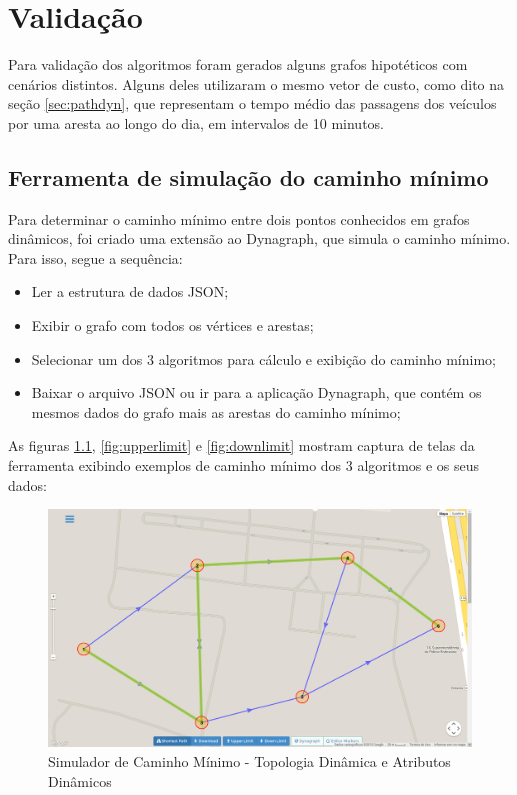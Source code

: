 \chapter{Validação}

Para validação dos algoritmos foram gerados alguns grafos hipotéticos com cenários distintos.
Alguns deles utilizaram o mesmo vetor de custo, como dito na seção \ref{sec:pathdyn}, que representam
o tempo médio das passagens dos veículos por uma aresta ao longo do dia, em intervalos de 10 minutos.


\section{Ferramenta de simulação do caminho mínimo}
Para determinar o caminho mínimo entre dois pontos conhecidos em grafos dinâmicos, foi criado
uma extensão ao Dynagraph, que simula o caminho mínimo. Para isso, segue a sequência:
\begin{itemize}
\item Ler a estrutura de dados JSON;
\item Exibir o grafo com todos os vértices e arestas;
\item Selecionar um dos 3 algoritmos para cálculo e exibição do caminho mínimo;
\item Baixar o arquivo JSON ou ir para a aplicação Dynagraph, que contém os mesmos dados do grafo mais as arestas do caminho mínimo;
\end{itemize}

As figuras \ref{fig:shortestpath}, \ref{fig:upperlimit} e \ref{fig:downlimit} mostram captura de telas
da ferramenta exibindo exemplos de caminho mínimo dos 3 algoritmos e os seus dados:

\begin{figure}[htbp]
\centering
 \includegraphics[width=.90\textwidth]{chapters/fig/validacao/shortestpath.png}
\caption{Simulador de Caminho Mínimo - Topologia Dinâmica e Atributos Dinâmicos}
\label{fig:shortestpath}
\end{figure}
\FloatBarrier

